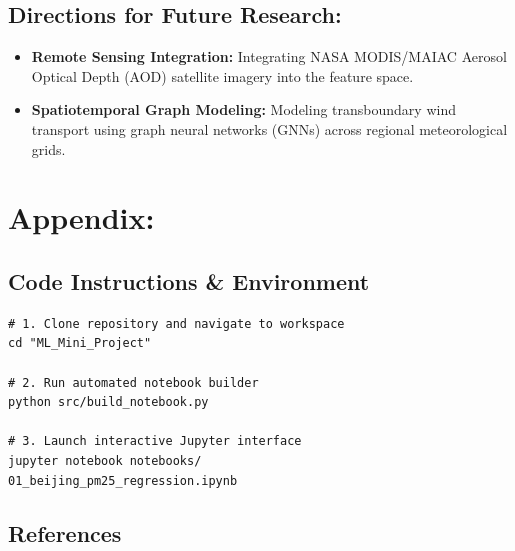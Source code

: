 \documentclass[a4paper,12pt,twocolumn]{article}
\begin{document}
\subsection{Directions for Future Research:}
\begin{itemize}
    \item \textbf{Remote Sensing Integration:} Integrating NASA MODIS/MAIAC Aerosol Optical Depth (AOD) satellite imagery into the feature space.
    \item \textbf{Spatiotemporal Graph Modeling:} Modeling transboundary wind transport using graph neural networks (GNNs) across regional meteorological grids.
\end{itemize}

\section{Appendix:}
\label{sec:appendix}

\subsection{Code Instructions \& Environment}
\begin{verbatim}
# 1. Clone repository and navigate to workspace
cd "ML_Mini_Project"

# 2. Run automated notebook builder
python src/build_notebook.py

# 3. Launch interactive Jupyter interface
jupyter notebook notebooks/
01_beijing_pm25_regression.ipynb
\end{verbatim}

\subsection{References}
\printbibliography[heading=none]
\end{document}

